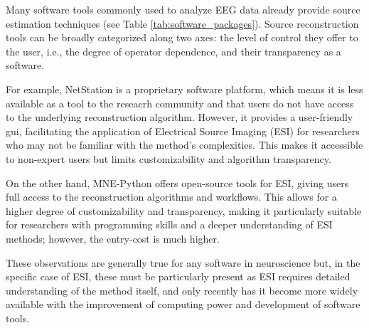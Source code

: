 Many software tools commonly used to analyze EEG data already provide source estimation techniques \cite{dasSurveyEEGData2023, michelEEGSourceImaging2019} (see Table \ref{tab:software_packages}). Source reconstruction tools can be broadly categorized along two axes: the level of control they offer to the user, i.e., the degree of operator dependence, and their transparency as a software.

For example, NetStation is a proprietary software platform, which means it is less available as a tool to the reseacrh community and that users do not have access to the underlying reconstruction algorithm. However, it provides a user-friendly \acrfull{gui}, facilitating the application of Electrical Source Imaging (ESI) for researchers who may not be familiar with the method's complexities. This makes it accessible to non-expert users but limits customizability and algorithm transparency.

On the other hand, MNE-Python \cite{gramfortMEGEEGData2013,gramfortMNESoftwareProcessing2014} offers open-source tools for ESI, giving users full access to the reconstruction algorithms and workflows. This allows for a higher degree of customizability and transparency, making it particularly suitable for researchers with programming skills and a deeper understanding of ESI methods; however, the entry-cost is much higher.

These observations are generally true for any software in neuroscience but, in the specific case of ESI, these must be particularly present as ESI requires detailed understanding of the method itself, and only recently has it become more widely available with the improvement of computing power and development of software tools.


